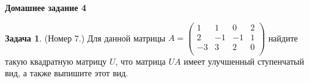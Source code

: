\documentclass[10pt, a4paper]{extarticle}
\theoremstyle{definition}
\newtheorem{Task}{Задача}
\begin{document}
\begin{center}
\small
\noindent{}
\end{center}

\large

\begin{center}
\textbf{Домашнее задание 4}
\end{center}

\begin{Task} (Номер 7.)
Для данной матрицы $A = 
    \begin{pmatrix}
     1 & 1 & 0 & 2 \\
     2 & -1 & -1 & 1 \\
     -3 & 3 & 2 & 0\\
    \end{pmatrix}$ найдите такую квадратную матрицу $U$, что матрица $UA$ имеет улучшенный ступенчатый вид, а также выпишите этот вид.
\end{Task}
\end{document}
